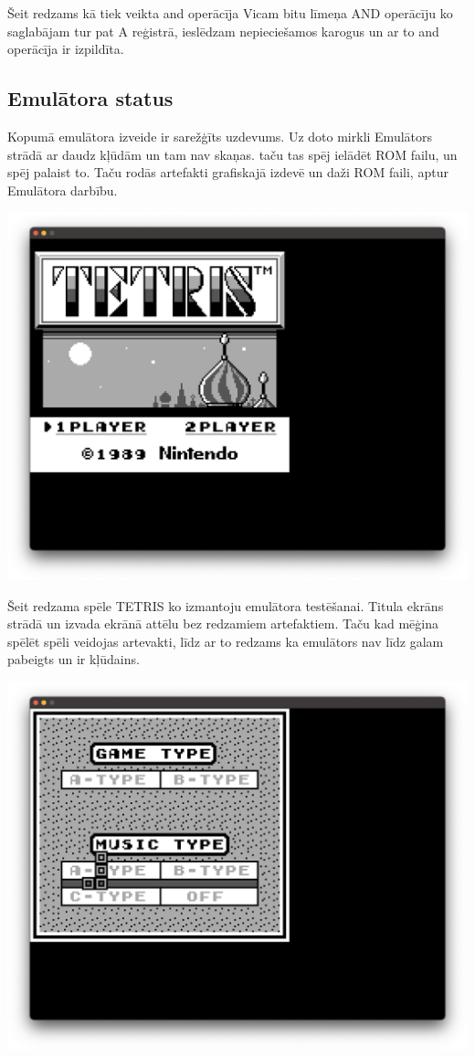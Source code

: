 \documentclass[12pt]{article}
\begin{document}
	Šeit redzams kā tiek veikta and operācīja Vicam bitu līmeņa AND operācīju ko saglabājam tur pat A reģistrā, ieslēdzam nepieciešamos karogus un ar to and operācīja ir izpildīta.
	
	\subsection{Emulātora status}
	Kopumā emulātora izveide ir sarežģīts uzdevums. Uz doto mirkli Emulātors strādā ar daudz kļūdām un tam nav skaņas. taču tas spēj ielādēt ROM failu, un spēj palaist to. Taču rodās artefakti grafiskajā izdevē un daži ROM faili, aptur Emulātora darbību.
	
	\includegraphics[scale=0.35]{img/gbemutetris.png}
	
	Šeit redzama spēle TETRIS ko izmantoju emulātora testēšanai. Titula ekrāns strādā un izvada ekrānā attēlu bez redzamiem artefaktiem. Taču kad mēģina spēlēt spēli veidojas artevakti, līdz ar to redzams ka emulātors nav līdz galam pabeigts un ir kļūdains.
	
	\pagebreak
	
	\includegraphics[scale=0.35]{img/gbemutetris2.png}
	
\end{document}
